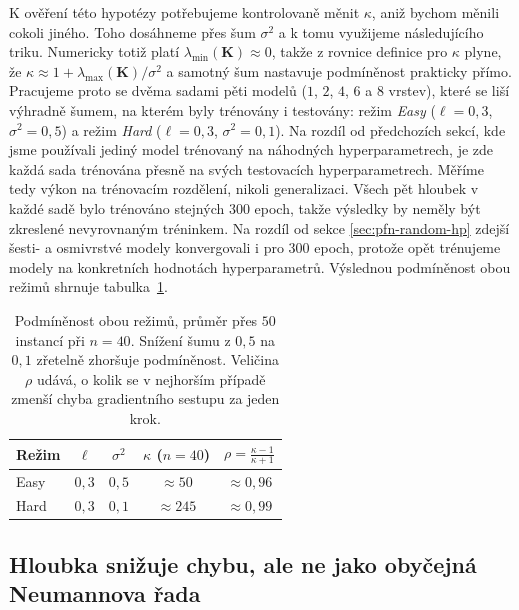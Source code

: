 K ověření této hypotézy potřebujeme kontrolovaně měnit $\kappa$, aniž bychom měnili cokoli jiného.
Toho dosáhneme přes šum $\sigma^2$ a k tomu využijeme následujícího triku.
Numericky totiž platí $\lambda_{\min}(\mathbf{K}) \approx 0$, takže z rovnice definice pro $\kappa$ plyne, že $\kappa \approx 1 + \lambda_{\max}(\mathbf{K})/\sigma^2$ a samotný šum nastavuje podmíněnost prakticky přímo.
Pracujeme proto se dvěma sadami pěti modelů ($1$, $2$, $4$, $6$ a $8$ vrstev), které se liší výhradně šumem, na kterém byly trénovány i testovány:
režim \emph{Easy} ($\ell = 0{,}3$, $\sigma^2 = 0{,}5$) a režim \emph{Hard} ($\ell = 0{,}3$, $\sigma^2 = 0{,}1$).
Na rozdíl od předchozích sekcí, kde jsme používali jediný model trénovaný na náhodných hyperparametrech, je zde každá sada trénována přesně na svých testovacích hyperparametrech.
Měříme tedy výkon na trénovacím rozdělení, nikoli generalizaci.
Všech pět hloubek v každé sadě bylo trénováno stejných $300$ epoch, takže výsledky by neměly být zkreslené nevyrovnaným tréninkem.
Na rozdíl od sekce \ref{sec:pfn-random-hp} zdejší šesti- a osmivrstvé modely konvergovali i pro $300$ epoch, protože opět trénujeme modely na konkretních hodnotách hyperparametrů. 
Výslednou podmíněnost obou režimů shrnuje tabulka~\ref{tab:ch2_kappa}.

\begin{table}[htbp]
\centering
\begin{tabular}{lcccc}
\hline
Režim & $\ell$ & $\sigma^2$ & $\kappa$ ($n{=}40$) & $\rho = \tfrac{\kappa-1}{\kappa+1}$ \\
\hline
Easy & $0{,}3$ & $0{,}5$ & $\approx 50$  & $\approx 0{,}96$ \\
Hard & $0{,}3$ & $0{,}1$ & $\approx 245$ & $\approx 0{,}99$ \\
\hline
\end{tabular}
\caption{Podmíněnost obou režimů, průměr přes $50$ instancí při $n = 40$. Snížení šumu z $0{,}5$ na $0{,}1$ zřetelně zhoršuje podmíněnost. Veličina $\rho$ udává, o kolik se v nejhorším případě zmenší chyba gradientního sestupu za jeden krok.}
\label{tab:ch2_kappa}
\end{table}

\subsection{Hloubka snižuje chybu, ale ne jako obyčejná Neumannova řada}
\label{subsec:ch2-neumann}

